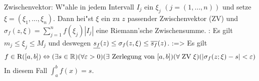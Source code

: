  Zwischenvektor:{
  W"ahle in jedem Intervall $I_j$ ein $\xi_j$ $(j=(1,\ldots,n))$ und setze 
  $\xi=(\xi_1,\ldots,\xi_n)$. Dann hei"st $\xi$ ein zu $z$ passender
  Zwischenvektor (ZV) und $\sigma_f(z,\xi)=\sum_{j=1}^n f(\xi_j)|I_j|$ 
  eine Riemann'sche Zwischensumme.
  }
\remark:{
  Es gilt $m_j\le\xi_j\le M_j$ und 
  deswegen $\underline{s_f}(z)\le\sigma_f(z,\xi)\le\overline{s_f}(z)$.
  }
\lessertheorem:=>{
  Es gilt 
  \[f\in{\rm R}([a,b])\Leftrightarrow(\exists s\in\mathbb R)(\forall \varepsilon>0)(\exists \text{ Zerlegung von $[a,b]$})
    (\forall \;\text{ZV}\;\xi)(|\sigma_f(z;\xi)-s|<\varepsilon)
    \]
  In diesem Fall $\int_a^b f(x)=s$.
  }
